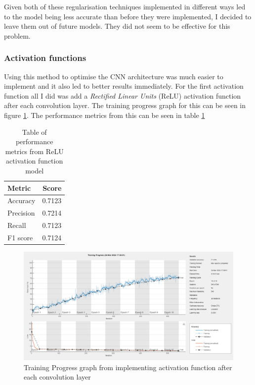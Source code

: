 \documentclass[11pt, letterpaper]{article}
\begin{document}
Given both of these regularisation techniques implemented in different ways led to the model being less accurate than before they were implemented, I decided to leave them out of future models. They did not seem to be effective for this problem.

\subsubsection*{Activation functions}
Using this method to optimise the CNN architecture was much easier to implement and it also led to better results immediately. For the first activation function all I did was add a \textit{Rectified Linear Units} (ReLU) activation function after each convolution layer. The training progress graph for this can be seen in figure \ref{fig:ReLUActivationTrainingProgress}. The performance metrics from this can be seen in table \ref{tab:ReLUActivationPerformanceMetrics}

\begin{table}[ht]
    \begin{center}
      \caption{Table of performance metrics from ReLU activation function model}
      \label{tab:ReLUActivationPerformanceMetrics}
      \begin{tabular}{l|r} %
        \textbf{Metric} & \textbf{Score}\\
        \hline
        Accuracy & 0.7123\\
        Precision & 0.7214\\
        Recall & 0.7123\\
        F1 score & 0.7124\\
      \end{tabular}
    \end{center}
  \end{table}

\begin{figure}[ht]
    \centering
    \includegraphics[width=1\linewidth]{Lab 5/ReLUActivationTrainingProgress.png}
    \caption{Training Progress graph from implementing activation function after each convolution layer}
    \label{fig:ReLUActivationTrainingProgress}
\end{figure}
\end{document}
